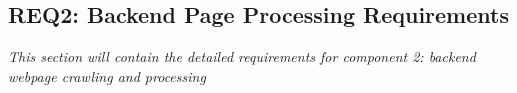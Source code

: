 \subsection{REQ2: Backend Page Processing Requirements}

\textit{This section will contain the detailed requirements for component 2: backend webpage crawling and processing}

